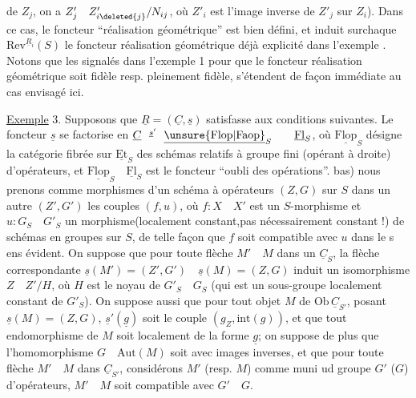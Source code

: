 de $Z_j$, on a $Z'_j\quad Z'_{i\deleted{j}}/N_{ij}$, où $Z'_i$ est l'image inverse de $Z'_j$ sur $Z_i$). Dans ce cas, le foncteur ``réalisation géométrique'' est bien défini, et induit surchaque $\mathrm{Rev}^{\underline{R}_i}(S)$ le foncteur réalisation géométrique déjà explicité dans l'exemple .  Notons que les  signalés dans l'exemple 1 pour que le foncteur réalisation géométrique soit fidèle resp. pleinement fidèle, s'étendent de façon immédiate au cas envisagé ici.

\uline{Exemple} 3. Supposons que $\underline{R}=(\underline{C},\underline{s})$ satisfasse aux conditions suivantes. Le foncteur $\underline{s}$ se factorise en $\underline{C}\overset{\underline{s}'}{\qquad}\underline{\unsure{\mathrm{Flop}|\mathrm{Faop}}}_S\qquad\underline{\mathrm{Fl}}_S$, où $\underline{\mathrm{Flop}}_S$ désigne la catégorie fibrée sur $\underline{\mathrm{Et}}_S$ des schémas relatifs à groupe fini (opérant à droite) d'opérateurs, et $\underline{\mathrm{Flop}}_S\quad\underline{\mathrm{Fl}}_S$ est le foncteur ``oubli des opérations''.  bas) nous prenons comme morphismes d'un schéma à opérateurs $(Z,G)$ sur $S$ dans un autre $(Z',G')$ les couples $(f,u)$, où $f:X\quad X'$ est un $S$-morphisme et $u:G_S\quad G'_S$ un morphisme(localement constant,\deleted{(}pas nécessairement constant !) de schémas en groupes sur $S$, de telle façon que $f$ soit compatible avec $u$ dans le s ens évident. On suppose que pour toute flèche $M'\quad M$ dans un $\underline{C}_S$,  la flèche correspondante $\underline{s}(M')=(Z',G')\quad\underline{s}(M)=(Z,G)$ induit un isomorphisme $Z\quad Z'/H$, où $H$ est le noyau de $G'_S\quad G_S$ (qui est un sous-groupe localement constant de $G'_S$). On suppose  aussi que pour tout objet $M$ de $\mathrm{Ob}\,\underline{C}_{S'}$, posant $\underline{s}(M)=(Z,G)$,  $\underline{s}'(\underline{g})$ soit le couple $(g_Z,\mathrm{int}(g))$, et que tout  endomorphisme de $M$ soit localement de la forme $\underline{g}$; on  suppose de plus que  l'homomorphisme $G\quad\mathrm{Aut}(M)$ soit  avec images inverses, et que pour toute flèche $M'\quad M$ dans $\underline{C}_{S'}$, considérons $M'$ (resp. $M$) comme muni ud groupe $G'$ ($G$) d'opérateurs, $M'\quad M$ soit compatible avec $G'\quad G$.
